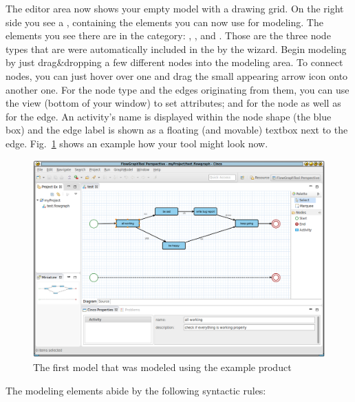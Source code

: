 \documentclass[a4paper,american,12pt]{scrreprt}
\begin{document}
The editor area now shows your empty model with a drawing grid. On the right
side you see a , containing the elements you can now use for modeling.
The elements you see there are in the 
category: , , and . Those are the three node
types that are were automatically included in the  by the
wizard. Begin modeling by just drag\&dropping a few different nodes into the
modeling area. To connect nodes, you can just hover over one and drag the small
appearing arrow icon onto another one. For the  node type and
the edges originating from them, you can use the  view (bottom
of your window) to set attributes;  and  for the
node as well as  for the edge. An activity's name is displayed
within the node shape (the blue box) and the edge label is shown as a floating
(and movable) textbox next to the edge. Fig.~\ref{fig:firstModel} shows an
example how your tool might look now.

\begin{figure}
	\centering
	\includegraphics[width=.9\textwidth]{screenshots/cp-first-model.png} 
	\caption{The first model that was modeled using the example \cinco product}
	\label{fig:firstModel}
\end{figure}

The modeling elements abide by the following syntactic rules:
\end{document}
